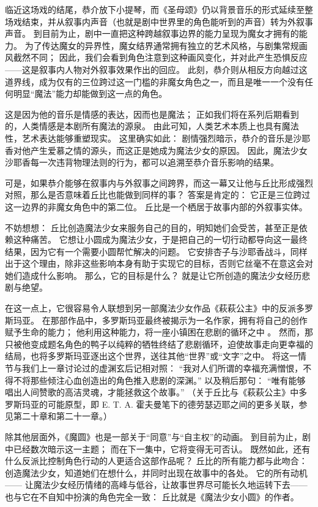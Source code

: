 临近这场戏的结尾，恭介放下小提琴，而《圣母颂》仍以背景音乐的形式延续至整场戏结束，并从叙事内声音（也就是剧中世界里的角色能听到的声音）转为外叙事声音。
到目前为止，剧中一直把这种跨越叙事边界的能力呈现为魔女才拥有的能力。
为了传达魔女的异界性，魔女结界通常拥有独立的艺术风格，与剧集常规画风截然不同；
因此，我们会看到角色注意到这种画风变化，并对此产生恐惧反应——这是叙事内人物对外叙事效果作出的回应。
此刻，恭介则从相反方向越过这道界线，成为仅有的三位跨过这一门槛的非魔女角色之一，而且是唯一一个没有任何明显“魔法”能力却能做到这一点的角色。

这是因为他的音乐是情感的表达，因而也是魔法；
正如我们将在系列后期看到的，人类情感是本剧所有魔法的源泉。
由此可知，人类艺术本质上也具有魔法性，艺术表达能够重塑现实。
这里确实如此：
剧情强烈暗示，恭介的音乐是沙耶香对他产生爱慕之情的源头，而这正是她成为魔法少女的原因。
因此，魔法少女沙耶香每一次违背物理法则的行为，都可以追溯至恭介音乐影响的结果。

可是，如果恭介能够在叙事内与外叙事之间跨界，而这一幕又让他与丘比形成强烈对照，那么是否意味着丘比也能做到同样的事？
答案是肯定的：
它正是三位跨过这一边界的非魔女角色中的第二位。
丘比是一个栖居于故事内部的外叙事实体。

不妨想想：
丘比创造魔法少女来服务自己的目的，明知她们会受苦，甚至正是依赖这种痛苦。
它想让小圆成为魔法少女，于是把自己的一切行动都导向这一最终结果，因为它有一个需要小圆帮忙解决的问题。
它安排杏子与沙耶香战斗，同样出于这个理由，除非这些影响本身有助于实现它的目标，否则它丝毫不在意这会对她们造成什么影响。
那么，它的目标是什么？
就是让它所创造的魔法少女经历悲剧与绝望。

在这一点上，它很容易令人联想到另一部魔法少女作品《萩萩公主》中的反派多罗斯玛亚\cite{princess-tutu-2011}。
在那部作品中，多罗斯玛亚最终被揭示为一名作家，拥有将自己的创作赋予生命的能力；
他利用这种能力，将一座小镇困在悲剧的循环之中
\cite{princess-tutu-spinners}。
然而，那只被他变成题名角色的鸭子以纯粹的牺牲终结了悲剧循环，迫使故事走向更幸福的结局，也将多罗斯玛亚逐出这个世界，送往其他“世界”或“文字”之中。
将这一情节与我们上一章讨论过的虚渊玄后记相对照：
“我对人们所谓的幸福充满憎恨，不得不将那些倾注心血创造出的角色推入悲剧的深渊。”
以及稍后那句：
“唯有能够唱出人间赞歌的高洁灵魂，才能拯救这个故事。”
\cite{urobuchi2006fate-zero}（关于丘比与《萩萩公主》中多罗斯玛亚的可能原型，即 E. T. A. 霍夫曼笔下的德劳瑟迈耶之间的更多关联，参见第二十章和第二十一章。）

除其他层面外，《魔圆》也是一部关于“同意”与“自主权”的动画。
到目前为止，剧中已经数次暗示这一主题；
而在下一集中，它将变得无可否认。
既然如此，还有什么反派比控制角色行动的人更适合这部作品呢？
丘比的所有能力都与此吻合：
创造魔法少女，知道她们在想什么，并同时出现在故事中的各处。
它的所有动机——
让魔法少女经历情绪的高峰与低谷，让故事世界尽可能长久地运转下去——
也与它在不自知中扮演的角色完全一致：
丘比就是《魔法少女小圆》的作者。
